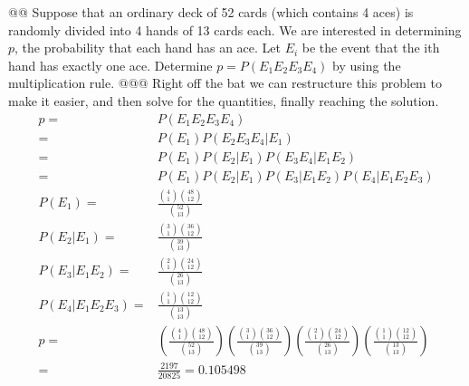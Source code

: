 \documentclass[10pt]{article}
\begin{document}
\begin{easylist}[enumerate]
    @@ Suppose that an ordinary deck of 52 cards (which contains 4 aces) is randomly divided into 4 hands of 13 cards
    each. We are interested in determining $p$, the probability that each hand has an ace. Let $E_i$ be the event that
    the ith hand has exactly one ace.  Determine $p = P(E_1 E_2 E_3 E_4 )$ by using the multiplication rule.
    @@@ Right off the bat we can restructure this problem to make it easier, and then solve for the quantities, finally
    reaching the solution.
        \[
            \begin{aligned}
                p =& P(E_1 E_2 E_3 E_4)\\
                  =& P(E_1) P(E_2 E_3 E_4|E_1)\\
                  =& P(E_1) P(E_2|E_1) P(E_3 E_4 | E_1 E_2)\\
                  =& P(E_1) P(E_2|E_1) P(E_3|E_1 E_2) P(E_4|E_1E_2E_3)\\
              P(E_1) =& \frac{\binom{4}{1} \binom{48}{12}}{\binom{52}{13}}\\
              P(E_2|E_1) =& \frac{\binom{3}{1} \binom{36}{12}}{\binom{39}{13}}\\
              P(E_3|E_1E_2) =& \frac{\binom{2}{1} \binom{24}{12}}{\binom{26}{13}}\\
              P(E_4|E_1E_2E_3) =& \frac{\binom{1}{1} \binom{12}{12}}{\binom{13}{13}}\\
              p =&
              \left( \frac{\binom{4}{1} \binom{48}{12}}{\binom{52}{13}} \right)
              \left( \frac{\binom{3}{1} \binom{36}{12}}{\binom{39}{13}} \right)
              \left( \frac{\binom{2}{1} \binom{24}{12}}{\binom{26}{13}} \right)
              \left( \frac{\binom{1}{1} \binom{12}{12}}{\binom{13}{13}} \right)\\
              =& \frac{2197}{20825} = \boxed{0.105498}
            \end{aligned}
        \]


\end{easylist}
\end{document}
